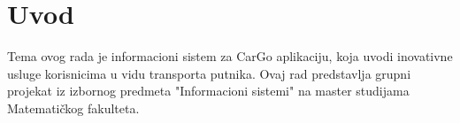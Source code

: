 \section{\bfseries Uvod}
\par Tema ovog rada je informacioni sistem za CarGo aplikaciju, koja uvodi inovativne usluge korisnicima u vidu transporta putnika. Ovaj rad predstavlja grupni projekat iz izbornog predmeta "Informacioni sistemi" na master studijama Matematičkog fakulteta. 